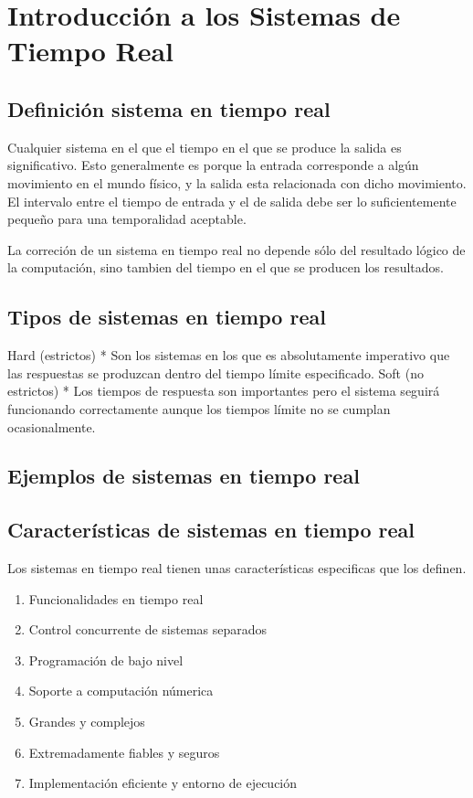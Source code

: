 \section{Introducción a los Sistemas de Tiempo Real}

\subsection{Definición sistema en tiempo real}

Cualquier sistema en el que el tiempo en el que se produce la salida es 
significativo. Esto generalmente es porque la entrada corresponde a algún 
movimiento en el mundo físico, y la salida esta relacionada con dicho 
movimiento. El intervalo entre el tiempo de entrada y el de salida debe ser
lo suficientemente pequeño para una temporalidad aceptable.

La correción de un sistema en tiempo real no depende sólo del resultado 
lógico de la computación, sino tambien del tiempo en el que se producen los 
resultados.

\subsection{Tipos de sistemas en tiempo real}

	Hard (estrictos) 
		* Son los sistemas en los que es absolutamente imperativo
		que las respuestas se produzcan dentro del tiempo límite
		especificado.
	Soft (no estrictos)
		* Los tiempos de respuesta son importantes pero el sistema
		seguirá funcionando correctamente aunque los tiempos límite
		no se cumplan ocasionalmente.

\subsection{Ejemplos de sistemas en tiempo real}

\subsection{Características de sistemas en tiempo real}

Los sistemas en tiempo real tienen unas características especificas que los
definen.

\begin{enumerate}
\item Funcionalidades en tiempo real
\item Control concurrente de sistemas separados
\item Programación de bajo nivel
\item Soporte a computación númerica
\item Grandes y complejos
\item Extremadamente fiables y seguros
\item Implementación eficiente y entorno de ejecución
\end{enumerate}
